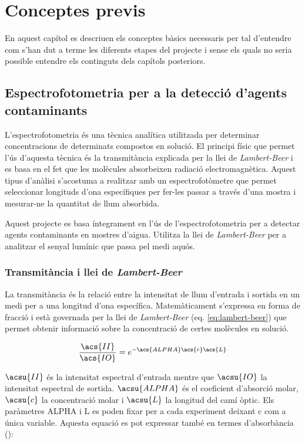 \chapter{Conceptes previs}\label{ch:conceptes_previs}

En aquest capítol es descriuen els conceptes bàsics necessaris per tal d'entendre com s'han dut a terme les diferents etapes del projecte i sense els quals no seria possible entendre els continguts dels capítols posteriors.

\section{Espectrofotometria per a la detecció d'agents contaminants}\label{sec:espectrofotometria_per_a_la_detecció_d'agents_contaminants}

L'espectrofotometria és una tècnica analítica utilitzada per determinar concentracions de determinats compostos en solució. El principi físic que permet l'ús d'aquesta tècnica és la transmitància explicada per la llei de \textit{Lambert-Beer} i es basa en el fet que les molècules absorbeixen radiació electromagnètica. Aquest tipus d'anàlisi s'acostuma a realitzar amb un espectrofotòmetre que permet seleccionar longituds d'ona específiques per fer-les passar a través d'una mostra i mesurar-ne la quantitat de llum absorbida.

Aquest projecte es basa íntegrament en l'ús de l'espectrofotometria per a detectar agents contaminants en mostres d'aigua. Utilitza la llei de \textit{Lambert-Beer} per a analitzar el senyal lumínic que passa pel medi aquós.

\subsection{Transmitància i llei de \textit{Lambert-Beer}}\label{subsec:lambert-beer}

La transmitància és la relació entre la intensitat de llum d'entrada i sortida en un medi per a una longitud d'ona específica. Matemàticament s'expressa en forma de fracció i està governada per la llei de \textit{Lambert-Beer} (eq. \ref{eq:lambert-beer}) que permet obtenir informació sobre la concentració de certes molècules en solució.

\begin{equation}\label{eq:lambert-beer}
\frac{\acs{II}}{\acs{IO}} = e^{-\acs{ALPHA}\acs{c}\acs{L}}
\end{equation}

$ \acsu{II} $ és la intensitat espectral d'entrada mentre que $ \acsu{IO} $ la intensitat espectral de sortida. $ \acsu{ALPHA} $ és el coeficient d'absorció molar, $ \acsu{c} $ la concentració molar i $ \acsu{L} $ la longitud del camí òptic. Els paràmetres \ac{ALPHA} i \ac{L} es poden fixar per a cada experiment deixant \ac{c} com a única variable. Aquesta equació es pot expressar també en termes d'absorbància ():

